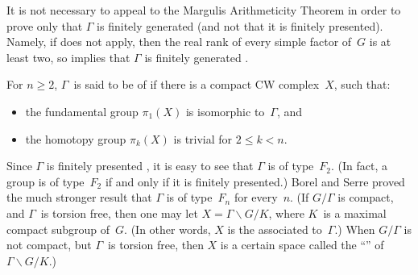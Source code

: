 \begin{rem}
 It is not necessary to appeal to the Margulis
Arithmeticity Theorem in order to prove only that
$\Gamma$ is finitely generated (and not that it is finitely presented).
Namely, if  does not apply,
then the real rank of every simple factor of~$G$ is at
least two, so  implies that $\Gamma$ is finitely
generated  .
 \end{rem}


\begin{rem} \label{typeFn}
For $n \ge 2$, $\Gamma$~is said to be of  if there is a compact CW complex~$X$, such that:
	\begin{itemize}
	\item the fundamental group $\pi_1(X)$ is isomorphic to~$\Gamma$,
	and
	\item the homotopy group $\pi_k(X)$ is trivial for $2 \le k < n$.
	\end{itemize}
Since $\Gamma$ is finitely presented , it is easy to see that $\Gamma$ is of type~$F_2$.
(In fact, a group is of type~$F_2$ if and only if it is finitely presented.)
Borel and Serre proved the much stronger result that $\Gamma$ is of type~$F_n$ for every~$n$. 
(If $G/\Gamma$ is compact, and $\Gamma$~is torsion free, then one may let $X = \Gamma \backslash G/K$, where $K$~is a maximal compact subgroup of~$G$. (In other words, $X$ is the  associated to~$\Gamma$.) When $G/\Gamma$ is not compact, but $\Gamma$~is torsion free, then $X$ is a certain space called the ``'' of $\Gamma \backslash G/K$.)
\end{rem}

